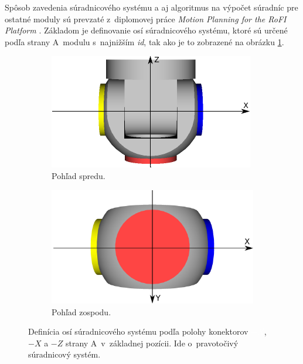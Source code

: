 \documentclass[
  printed, %
  oneside, %
  notable,   %
  nolof,     %
  nolot,     %
]{fithesis3}
\begin{document}
Spôsob zavedenia súradnicového systému a aj algoritmus na výpočet súradníc pre ostatné moduly sú prevzaté z~diplomovej práce \textit{Motion Planning for the RoFI Platform} \cite{vozarovaMasterThesis}. Základom je definovanie osí súradnicového systému, ktoré sú určené podľa strany A~modulu s~najnižším \textit{id}, tak ako je to zobrazené na obrázku \ref{fig:moduleAxis}. 

\begin{figure}[hbt!]
    \centering
    \begin{subfigure}[b]{0.47\textwidth}
        \includegraphics[width=\textwidth]{pictures/module_dock_identification.pdf}
        \caption[Pohľad spredu]{Pohľad spredu.}
    \end{subfigure}
    \begin{subfigure}[b]{0.47\textwidth}
        \includegraphics[width=\textwidth]{pictures/module_dock_identification_bottom.pdf}
        \caption[Pohľad zospodu]{Pohľad zospodu.}
    \end{subfigure}
    \caption[Definícia osí súradnicového systému]{Definícia osí súradnicového systému podľa polohy konektorov \textcolor{white}{\colorbox{modra}{$+X$}}, \colorbox{zlta}{$-X$} a \colorbox{cervena}{$-Z$} strany A~v~základnej pozícii. Ide o~pravotočivý súradnicový systém. }
    \label{fig:moduleAxis}
\end{figure}
\end{document}

